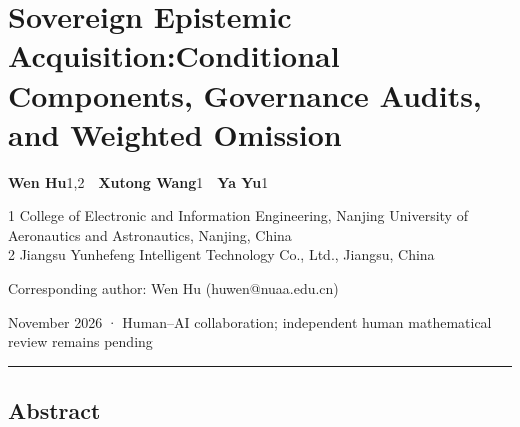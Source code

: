 \documentclass[
  11pt]{article}
\author{}
\date{17 November 2026}
\begin{document}
\section{\texorpdfstring{Sovereign Epistemic
Acquisition:\newline Conditional Components, Governance Audits, and
Weighted
Omission}{Sovereign Epistemic Acquisition:Conditional Components, Governance Audits, and Weighted Omission}}\label{sovereign-epistemic-acquisitionconditional-components-governance-audits-and-weighted-omission}

\textbf{Wen Hu}1,2~~\textbf{Xutong Wang}1~~\textbf{Ya Yu}1

1 College of Electronic and Information Engineering, Nanjing University
of Aeronautics and Astronautics, Nanjing, China\\
2 Jiangsu Yunhefeng Intelligent Technology Co., Ltd., Jiangsu, China

Corresponding author: Wen Hu (huwen@nuaa.edu.cn)

November 2026 · Human--AI collaboration; independent human mathematical
review remains pending

\begin{center}\rule{0.5\linewidth}{0.5pt}\end{center}

\subsection{Abstract}\label{abstract}
\end{document}
